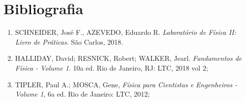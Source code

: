 \newpage
\section{Bibliografia}

\begin{enumerate}
  \item SCHNEIDER, José F., AZEVEDO, Eduardo R. \textit{Laboratório de Física II: Livro de Práticas}. São Carlos, 2018.\label{bibl:apostila}
  \item HALLIDAY, David; RESNICK, Robert; WALKER, Jearl. \textit{Fundamentos de Física - Volume 1}. 10a ed. Rio de Janeiro, RJ: LTC, 2018 vol 2;
  \item TIPLER, Paul A.; MOSCA, Gene, \textit{Física para Cientistas e Engenheiros - Volume 1}, 6a ed. Rio de Janeiro: LTC, 2012;
\end{enumerate}
